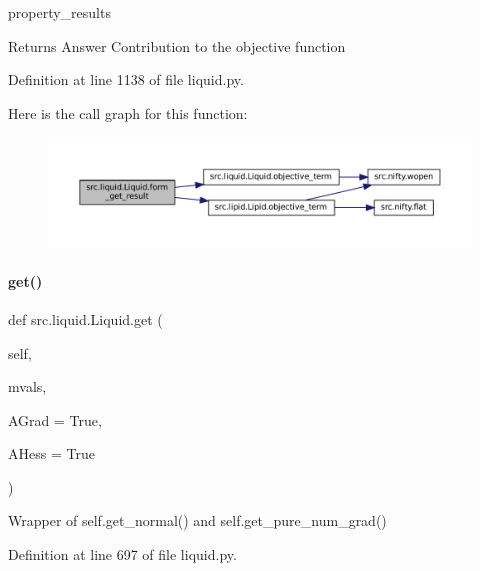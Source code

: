 property\+\_\+results \begin{DoxyReturn}{Returns}
Answer Contribution to the objective function 
\end{DoxyReturn}


Definition at line 1138 of file liquid.\+py.

Here is the call graph for this function\+:
\nopagebreak
\begin{figure}[H]
\begin{center}
\leavevmode
\includegraphics[width=350pt]{classsrc_1_1liquid_1_1Liquid_a6c7d6b8ce3f748fba7db1d390ff6fed9_cgraph}
\end{center}
\end{figure}
\mbox{\label{classsrc_1_1liquid_1_1Liquid_ad55246e641f979a22458c645c362abbe}} 
\paragraph{\texorpdfstring{get()}{get()}}
{\footnotesize\ttfamily def src.\+liquid.\+Liquid.\+get (\begin{DoxyParamCaption}\item[{}]{self,  }\item[{}]{mvals,  }\item[{}]{A\+Grad = {\ttfamily True},  }\item[{}]{A\+Hess = {\ttfamily True} }\end{DoxyParamCaption})}



Wrapper of self.\+get\+\_\+normal() and self.\+get\+\_\+pure\+\_\+num\+\_\+grad() 



Definition at line 697 of file liquid.\+py.

